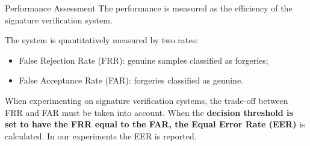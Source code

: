\documentclass{beamer}
\begin{document}
\begin{frame}{Performance Assessment}
The performance is measured as the efficiency of the signature verification system.

The system is quantitatively measured by two rates: 
\begin{itemize}
\item False Rejection Rate (FRR): genuine samples classified as forgeries;
\item False Acceptance Rate (FAR): forgeries classified as genuine.
\end{itemize}

When experimenting on signature verification systems, the trade-off between FRR and FAR must be taken into account. When the \textbf{decision threshold is set to have the FRR equal to the FAR, the Equal Error Rate (EER) }is calculated. In our experiments the EER is reported.




\end{frame}
\end{document}
